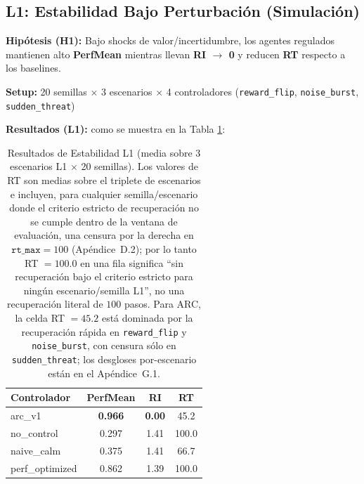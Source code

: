 \documentclass{article}
\begin{document}
\subsection{L1: Estabilidad Bajo Perturbación (Simulación)}

\textbf{Hipótesis (H1):} Bajo shocks de valor/incertidumbre, los agentes regulados mantienen alto \textbf{PerfMean} mientras llevan \textbf{RI $\to$ 0} y reducen \textbf{RT} respecto a los baselines.

\textbf{Setup:} 20 semillas $\times$ 3 escenarios $\times$ 4 controladores (\texttt{reward\_flip}, \texttt{noise\_burst}, \texttt{sudden\_threat})

\textbf{Resultados (L1):} como se muestra en la Tabla \ref{tab:l1_results}:

\begin{table}[htbp]
\centering
\caption{Resultados de Estabilidad L1 (media sobre 3 escenarios L1 $\times$ 20 semillas). Los valores de RT son medias sobre el triplete de escenarios e incluyen, para cualquier semilla/escenario donde el criterio estricto de recuperación no se cumple dentro de la ventana de evaluación, una censura por la derecha en $\texttt{rt\_max}=100$ (Apéndice~D.2); por lo tanto RT $=100.0$ en una fila significa ``sin recuperación bajo el criterio estricto para ningún escenario/semilla L1'', no una recuperación literal de $100$ pasos. Para ARC, la celda RT $=45.2$ está dominada por la recuperación rápida en \texttt{reward\_flip} y \texttt{noise\_burst}, con censura sólo en \texttt{sudden\_threat}; los desgloses por-escenario están en el Apéndice~G.1.}
\label{tab:l1_results}
\begin{tabular}{@{}lccc@{}}
\toprule
Controlador & PerfMean & RI & RT \\ \midrule
arc\_v1 & \textbf{0.966} & \textbf{0.00} & 45.2 \\
no\_control & 0.297 & 1.41 & 100.0 \\
naive\_calm & 0.375 & 1.41 & 66.7 \\
perf\_optimized & 0.862 & 1.39 & 100.0 \\ \bottomrule
\end{tabular}
\end{table}
\end{document}
